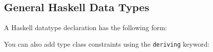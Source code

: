 \hypertarget{general-haskell-data-types}{%
\subsection{General Haskell Data
Types}\label{general-haskell-data-types}}

A Haskell datatype declaration has the following form:

\begin{Shaded}
\begin{Highlighting}[]
 \OperatorTok{\textless{}}\OperatorTok{\textgreater{}} 
    \OtherTok{=} \OperatorTok{\textless{}}\OperatorTok{\textgreater{}} \OperatorTok{\textless{}}\OperatorTok{\textgreater{}} \OperatorTok{\textless{}}\OperatorTok{\textgreater{}}\OperatorTok{\textless{}}\OperatorTok{\textgreater{}}
    \OperatorTok{|} \OperatorTok{\textless{}}\OperatorTok{\textgreater{}} \OperatorTok{\textless{}}\OperatorTok{\textgreater{}} \OperatorTok{\textless{}}\OperatorTok{\textgreater{}}\OperatorTok{\textless{}}\OperatorTok{\textgreater{}}
    \OperatorTok{|} \OperatorTok{\textless{}}\OperatorTok{\textgreater{}} \OperatorTok{\textless{}}\OperatorTok{\textgreater{}} \OperatorTok{\textless{}}\OperatorTok{\textgreater{}}\OperatorTok{\textless{}}\OperatorTok{\textgreater{}}
\end{Highlighting}
\end{Shaded}

You can also add type class constraints using the \texttt{deriving}
keyword:

